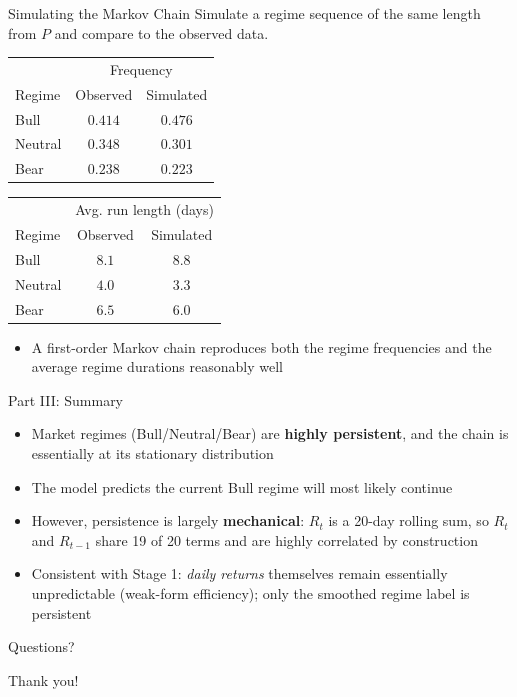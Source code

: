 \documentclass{beamer}
\begin{document}
\begin{frame}{Simulating the Markov Chain}
    Simulate a regime sequence of the same length from $P$ and compare to the observed data.
    \begin{table}
        \centering
        \begin{tabular}{lcc}
            \toprule
            & \multicolumn{2}{c}{Frequency} \\
            Regime & Observed & Simulated \\
            \midrule
            Bull    & $0.414$ & $0.476$ \\
            Neutral & $0.348$ & $0.301$ \\
            Bear    & $0.238$ & $0.223$ \\
            \bottomrule
        \end{tabular}
        \qquad
        \begin{tabular}{lcc}
            \toprule
            & \multicolumn{2}{c}{Avg. run length (days)} \\
            Regime & Observed & Simulated \\
            \midrule
            Bull    & $8.1$ & $8.8$ \\
            Neutral & $4.0$ & $3.3$ \\
            Bear    & $6.5$ & $6.0$ \\
            \bottomrule
        \end{tabular}
    \end{table}
    \begin{itemize}
        \item A first-order Markov chain reproduces both the regime frequencies and the
              average regime durations reasonably well
    \end{itemize}
\end{frame}

\begin{frame}{Part III: Summary}
    \begin{itemize}
        \item Market regimes (Bull/Neutral/Bear) are \textbf{highly persistent}, and the
              chain is essentially at its stationary distribution
        \item The model predicts the current Bull regime will most likely continue
        \item However, persistence is largely \textbf{mechanical}: $R_t$ is a 20-day rolling
              sum, so $R_t$ and $R_{t-1}$ share 19 of 20 terms and are highly correlated by
              construction
        \item Consistent with Stage 1: \emph{daily returns} themselves remain essentially
              unpredictable (weak-form efficiency); only the smoothed regime label is
              persistent
    \end{itemize}
\end{frame}

\begin{frame}[plain]
    \begin{center}
        {\Huge Questions?}
    \end{center}
\end{frame}

\begin{frame}[plain]
    \begin{center}
        {\Huge Thank you!}
    \end{center}
\end{frame}
\end{document}
